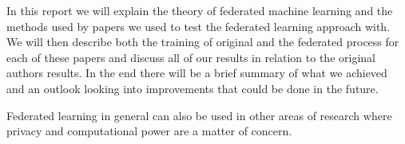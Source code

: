 In this report we will explain the theory of federated machine learning and the methods used by papers we used to test the federated learning approach with. We will then describe both the training of original and the federated process for each of these papers and discuss all of our results in relation to the original authors results. In the end there will be a brief summary of what we achieved and an outlook looking into improvements that could be done in the future.

Federated learning in general can also be used in other areas of research where privacy and computational power are a matter of concern.
